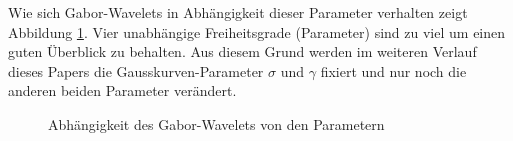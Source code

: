 Wie sich Gabor-Wavelets in Abhängigkeit dieser Parameter verhalten zeigt Abbildung \ref{fig:kernels}.
Vier unabhängige Freiheitsgrade (Parameter) sind zu viel um einen guten Überblick zu behalten.
Aus diesem Grund werden im weiteren Verlauf dieses Papers die Gausskurven-Parameter $\sigma$ und $\gamma$ fixiert und nur noch die anderen beiden Parameter verändert.

\begin{figure}
	\centering
	
	
	\caption{Abhängigkeit des Gabor-Wavelets von den Parametern}
	\label{fig:kernels}
\end{figure}
